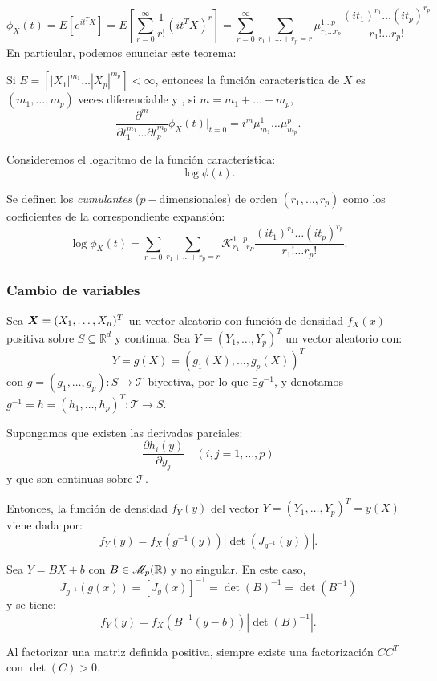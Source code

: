 \[
\phi_X(t) = E\left[e^{it^T X}\right] = E\left[\sum_{r=0}^\infty \frac{1}{r!}(i t^T X)^r\right] = \sum_{r= 0}^\infty \sum _{r_1+\dots + r_p = r} \mu_{r_1 \dots r_p}^{1 \dots p} \frac{(it_1)^{r_1} \dots (it_p)^{r_p}}{r_1 ! \dots r_p !}
\]
En particular, podemos enunciar este teorema:
\begin{nth}
  Si $E=\left[|X_1|^{m_1} \dots |X_p|^{m_p}\right] < \infty$, entonces la función característica de $X$ es $(m_1, \dots, m_p)$ veces diferenciable y , si $m = m_1 + \dots + m_p$,
  \[
\frac{\partial ^m}{\partial t_1^{m_1} \dots \partial t_p^{m_p}} \phi_X(t)| _{t = 0} = i^m \mu_{m_1}^1 \dots \mu_{m_p}^p
  .\]
\end{nth}

Consideremos el logaritmo de la función característica:
\[
\log \phi(t).
\]
\begin{ndef}
  Se definen los \emph{cumulantes} ($p-$dimensionales) de orden $(r_1 , \dots, r_p)$ como los coeficientes de la correspondiente expansión:
  \[
  \log \phi_X(t) =  \sum_{r= 0} \sum_{r_1+\dots + r_p = r} \mathcal K_{r_1 \dots r_P}^{1\dots p} \frac{(it_1)^{r_1} \dots (it_p)^{r_p}}{r_1 ! \dots r_p !}
  .\]
\end{ndef}


\subsubsection{Cambio de variables}

\begin{nth} \label{cambiovariablealeatoria}
  Sea $\boldsymbol{X} = (X_1,\dots,X_n)^T$ un vector aleatorio con función de densidad $f_X(x)$ positiva sobre $S \subseteq \mathbb R^d$ y continua. Sea $Y = (Y_1,\dots,Y_p)^T$ un vector aleatorio con:
  \[
  Y = g(X) = (g_1(X),\dots ,g_p(X))^T
  \]
  con $g = (g_1,\dots,g_p): S \to \mathcal T$ biyectiva, por lo que $\exists g^{-1}$, y denotamos $g^{-1} = h = (h_1,\dots, h_p)^T : \mathcal T \to S$.

  Supongamos que existen las derivadas parciales:
  \[
    \frac{\partial h_i(y)}{\partial y_j} \quad (i,j = 1,\dots,p)
  \]
  y que son continuas sobre $\mathcal T$.

  Entonces, la función de densidad $f_Y(y)$ del vector $Y=(Y_1,\dots,Y_p)^T = y(X)$ viene dada por:
  \[
  f_Y(y) = f_X(g^{-1}(y))\left|\det(J_{g^{-1}}(y))\right|
  .\]
\end{nth}

\begin{ncor} \label{cambiocasolineal}
  Sea $Y = BX + b$ con $B\in \mathscr{M}_{p}(\mathbb{R})$ y no singular. En este caso,
  \[
  J_{g^{-1}}(g(x)) = \left[ J_{g}(x) \right]^{-1} = \det(B)^{-1} = \det\left(B^{-1}\right)
  \]
  y se tiene:
  \[
  f_Y(y) = f_X\left(B^{-1}(y-b)\right)\left|\det(B)^{-1}\right|
  .\]

\end{ncor}
\begin{nota}
  Al factorizar una matriz definida positiva, siempre existe una factorización $CC^T$ con $\det(C) > 0$.
  \end{nota}

